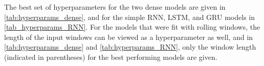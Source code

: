 The best set of hyperparameters for the two dense models are given in \cref{tab:hyperparams_dense}, and for the simple RNN, LSTM, and GRU models in \cref{tab_hyperparams_RNN}. For the models that were fit with rolling windows, the length of the input windows can be viewed as a hyperparameter as well, and in \cref{tab:hyperparams_dense} and \cref{tab:hyperparams_RNN}, only the window length (indicated in parentheses) for the best performing models are given.

\begin{table}[h]
\centering
\caption{The best hyperparameters for the two dense models. }
\label{tab:hyperparams_dense}
\end{table}

